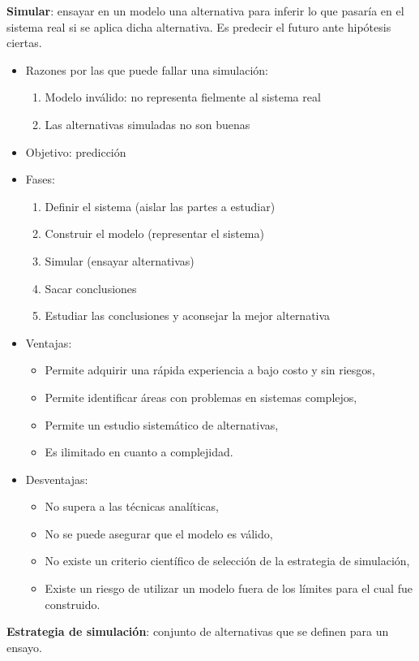\documentclass[12pt,a4paper, twoside]{paquetes-apunte/apunte}
\begin{document}
\textbf{Simular}: ensayar en un modelo una alternativa para inferir
lo que pasaría en el sistema real si se aplica dicha alternativa.
Es predecir el futuro ante hipótesis ciertas.
\begin{itemize}
\item Razones por las que puede fallar una simulación:

\begin{enumerate}
\item Modelo inválido: no representa fielmente al sistema real
\item Las alternativas simuladas no son buenas
\end{enumerate}
\item Objetivo: predicción
\item Fases:

\begin{enumerate}
\item Definir el sistema (aislar las partes a estudiar)
\item Construir el modelo (representar el sistema)
\item Simular (ensayar alternativas)
\item Sacar conclusiones
\item Estudiar las conclusiones y aconsejar la mejor alternativa
\end{enumerate}
\item Ventajas:

\begin{itemize}
\item Permite adquirir una rápida experiencia a bajo costo y sin riesgos,
\item Permite identificar áreas con problemas en sistemas complejos,
\item Permite un estudio sistemático de alternativas,
\item Es ilimitado en cuanto a complejidad.
\end{itemize}
\item Desventajas:

\begin{itemize}
\item No supera a las técnicas analíticas,
\item No se puede asegurar que el modelo es válido,
\item No existe un criterio científico de selección de la estrategia de
simulación,
\item Existe un riesgo de utilizar un modelo fuera de los límites para el
cual fue construido.
\end{itemize}
\end{itemize}
\textbf{Estrategia de simulación}: conjunto de alternativas que se
definen para un ensayo.
\end{document}
